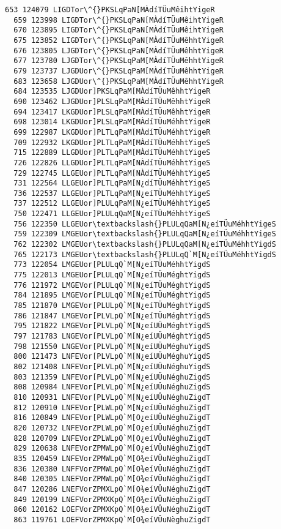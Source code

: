 \documentclass[11pt]{article}
\begin{document}
\begin{Verbatim}[commandchars=\\\{\}]
  653 124079 LIGDTor\^{}PKSLqPaN[MÀdíTÜuMêihtYigeR
  659 123998 LIGDTor\^{}PKSLqPaN[MÀdíTÜuMêihtYigeR
  670 123895 LIGDTor\^{}PKSLqPaN[MÀdíTÜuMêihtYigeR
  675 123852 LIGDTor\^{}PKSLqPaN[MÀdíTÜuMêhhtYigeR
  676 123805 LJGDTor\^{}PKSLqPaN[MÀdíTÜuMêhhtYigeR
  677 123780 LJGDTor\^{}PKSLqPaM[MÀdíTÜuMêhhtYigeR
  679 123737 LJGDUor\^{}PKSLqPaM[MÀdíTÜuMêhhtYigeR
  683 123658 LJGDUor\^{}PKSLqPaM[MÀdíTÜuMêhhtYigeR
  684 123535 LJGDUor]PKSLqPaM[MÀdíTÜuMêhhtYigeR
  690 123462 LJGDUor]PLSLqPaM[MÀdíTÜuMêhhtYigeR
  694 123417 LKGDUor]PLSLqPaM[MÀdíTÜuMêhhtYigeR
  698 123014 LKGDUor]PLSLqPaM[MÀdíTÜuMéhhtYigeR
  699 122987 LKGDUor]PLTLqPaM[MÀdíTÜuMéhhtYigeR
  709 122932 LKGDUor]PLTLqPaM[MÀdíTÜuMéhhtYigeS
  715 122889 LLGDUor]PLTLqPaM[MÀdíTÜuMéhhtYigeS
  726 122826 LLGDUor]PLTLqPaM[NÀdíTÜuMéhhtYigeS
  729 122745 LLGEUor]PLTLqPaM[NÀdíTÜuMéhhtYigeS
  731 122564 LLGEUor]PLTLqPaM[N¿díTÜuMéhhtYigeS
  736 122537 LLGEUor]PLTLqPaM[N¿eíTÜuMéhhtYigeS
  737 122512 LLGEUor]PLULqPaM[N¿eíTÜuMéhhtYigeS
  750 122471 LLGEUor]PLULqQaM[N¿eíTÜuMéhhtYigeS
  756 122350 LLGEUor\textbackslash{}PLULqQaM[N¿eíTÜuMéhhtYigeS
  759 122309 LMGEUor\textbackslash{}PLULqQaM[N¿eíTÜuMéhhtYigeS
  762 122302 LMGEUor\textbackslash{}PLULqQaM[N¿eíTÜuMéhhtYigdS
  765 122173 LMGEUor\textbackslash{}PLULqQ`M[N¿eíTÜuMéhhtYigdS
  773 122054 LMGEUor[PLULqQ`M[N¿eíTÜuMéhhtYigdS
  775 122013 LMGEUor[PLULqQ`M[N¿eíTÜuMéghtYigdS
  776 121972 LMGEVor[PLULqQ`M[N¿eíTÜuMéghtYigdS
  784 121895 LMGEVor[PLULqQ`M[N¿eíTÜuMéghtYigdS
  785 121870 LMGEVor[PLULpQ`M[N¿eíTÜuMéghtYigdS
  786 121847 LMGEVor[PLVLpQ`M[N¿eíTÜuMéghtYigdS
  795 121822 LMGEVor[PLVLpQ`M[N¿eíUÜuMéghtYigdS
  797 121783 LNGEVor[PLVLpQ`M[N¿eíUÜuMéghtYigdS
  798 121550 LNGEVor[PLVLpQ`M[N¿eíUÜuMéghuYigdS
  800 121473 LNFEVor[PLVLpQ`M[N¿eíUÜuMéghuYigdS
  802 121408 LNFEVor[PLVLpQ`M[N¿eíUÜuNéghuYigdS
  803 121359 LNFEVor[PLVLpQ`M[N¿eíUÜuNéghuZigdS
  808 120984 LNFEVor[PLVLpQ`M[N¿eíUÛuNéghuZigdS
  810 120931 LNFEVor[PLVLpQ`M[N¿eíUÛuNéghuZigdT
  812 120910 LNFEVor[PLWLpQ`M[N¿eíUÛuNéghuZigdT
  816 120849 LNFEVor[PLWLpQ`M[O¿eíUÛuNéghuZigdT
  820 120732 LNFEVorZPLWLpQ`M[O¿eíUÛuNéghuZigdT
  828 120709 LNFEVorZPLWLpQ`M[O¿eíVÛuNéghuZigdT
  829 120638 LNFEVorZPMWLpQ`M[O¿eíVÛuNéghuZigdT
  835 120459 LNFEVorZPMWLpQ`M[O¾eíVÛuNéghuZigdT
  836 120380 LNFFVorZPMWLpQ`M[O¾eíVÛuNéghuZigdT
  840 120305 LNEFVorZPMWLpQ`M[O¾eíVÛuNéghuZigdT
  847 120286 LNEFVorZPMXLpQ`M[O¾eíVÛuNéghuZigdT
  849 120199 LNEFVorZPMXKpQ`M[O¾eíVÛuNéghuZigdT
  860 120162 LOEFVorZPMXKpQ`M[O¾eíVÛuNéghuZigdT
  863 119761 LOEFVorZPMXKpQ`M[O¾eíVÛuNèghuZigdT

\end{Verbatim}
\end{document}
